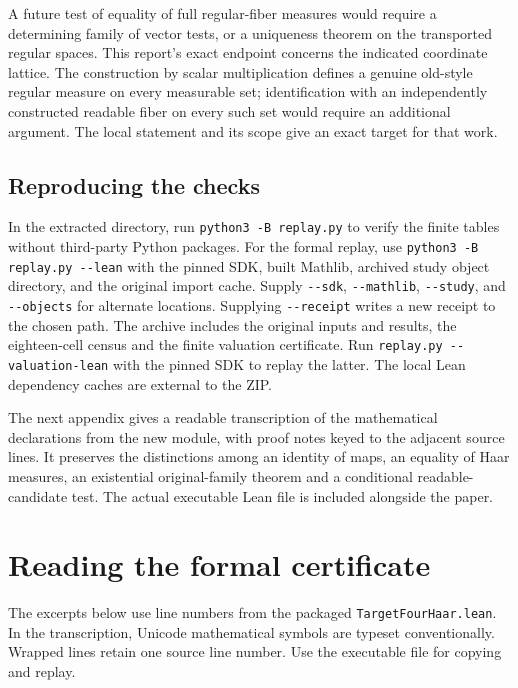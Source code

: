 \documentclass[12pt,letterpaper]{article}
\newcommand{\id}[1]{{\small\nolinkurl{#1}}}
\begin{document}
A future test of equality of full regular-fiber measures would require a determining family of vector tests, or a uniqueness theorem on the transported regular spaces. This report's exact endpoint concerns the indicated coordinate lattice. The construction by scalar multiplication defines a genuine old-style regular measure on every measurable set; identification with an independently constructed readable fiber on every such set would require an additional argument. The local statement and its scope give an exact target for that work.

\subsection{Reproducing the checks}
In the extracted directory, run \id{python3 -B replay.py} to verify the finite tables without third-party Python packages. For the formal replay, use \id{python3 -B replay.py --lean} with the pinned SDK, built Mathlib, archived study object directory, and the original import cache. Supply \id{--sdk}, \id{--mathlib}, \id{--study}, and \id{--objects} for alternate locations. Supplying \id{--receipt} writes a new receipt to the chosen path. The archive includes the original inputs and results, the eighteen-cell census and the finite valuation certificate. Run \id{replay.py --valuation-lean} with the pinned SDK to replay the latter. The local Lean dependency caches are external to the ZIP.

The next appendix gives a readable transcription of the mathematical declarations from the new module, with proof notes keyed to the adjacent source lines. It preserves the distinctions among an identity of maps, an equality of Haar measures, an existential original-family theorem and a conditional readable-candidate test. The actual executable Lean file is included alongside the paper.

\appendix
\section{Reading the formal certificate}
The excerpts below use line numbers from the packaged \id{TargetFourHaar.lean}. In the transcription, Unicode mathematical symbols are typeset conventionally. Wrapped lines retain one source line number. Use the executable file for copying and replay.
\end{document}
